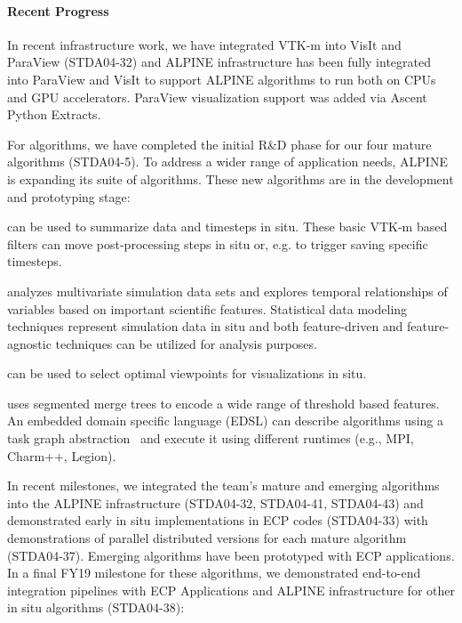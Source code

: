 \paragraph{Recent Progress}

In recent infrastructure work, we have  integrated VTK-m into VisIt and ParaView (STDA04-32) and 
ALPINE infrastructure has been fully integrated into ParaView and VisIt to support ALPINE algorithms to run both on CPUs and GPU accelerators.  
ParaView visualization support was added via  Ascent Python Extracts.  

For algorithms, we have completed the initial R\&D phase for our four mature algorithms (STDA04-5).  
To address a wider range of application needs, ALPINE is expanding its suite of algorithms.  These new algorithms are in the development and prototyping stage:
\begin{description}
	\setlength{\itemsep}{1pt}
	\setlength{\parskip}{0pt}
	\setlength{\parsep}{0pt}
	\item [Scalable Statistics] can be used to summarize data and timesteps in situ.  These basic VTK-m based filters can move post-processing steps in situ or, e.g. to trigger saving specific timesteps. 
	\item [Tracking over time]  analyzes multivariate simulation data sets and explores temporal relationships of variables based on  important scientific features. Statistical data modeling techniques represent simulation data in situ and both feature-driven and feature-agnostic techniques can be utilized for analysis purposes. 
	\item [Automated Viewpoint Selection] can be used to select optimal viewpoints for visualizations in situ.  
	\item [Feature extraction] uses segmented merge trees to encode a wide range of threshold based features.  An embedded domain specific language (EDSL) can describe algorithms using a  task graph abstraction~\cite{Petruzza:IPDPS18} and execute it using different runtimes (e.g., MPI, Charm++, Legion).
\end{description}

In recent milestones, we integrated the team’s mature and emerging algorithms into the ALPINE infrastructure (STDA04-32, STDA04-41, STDA04-43) and demonstrated early in situ implementations in ECP codes (STDA04-33) with demonstrations of parallel distributed versions for each mature algorithm (STDA04-37).  Emerging algorithms have been prototyped with ECP applications.  
In a final FY19 milestone for these algorithms, we demonstrated end-to-end integration pipelines with ECP Applications and ALPINE infrastructure for other in situ algorithms (STDA04-38):

